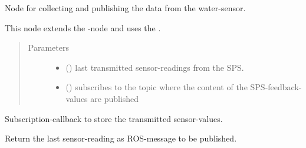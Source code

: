 \documentclass[a4paper,12pt,twoside]{article}
\begin{document}
\begin{fulllineitems}
\label{\detokenize{meso_control_pkg:meso_control_pkg.water_sensor_node.WaterSensor}}
Node for collecting and publishing the data from the water-sensor.

This node extends the -node and uses the .
\begin{quote}\begin{description}
\item[{Parameters}] \leavevmode\begin{itemize}
\item {} 
 (\sphinxstyleliteralemphasis{\sphinxupquote{{[}}}\sphinxstyleliteralemphasis{\sphinxupquote{{]}}}) \textendash{} last transmitted sensor-readings from the SPS.

\item {} 
 () \textendash{} subscribes to the topic where the content of the SPS-feedback-values
are published

\end{itemize}

\end{description}\end{quote}

\begin{fulllineitems}
\label{\detokenize{meso_control_pkg:meso_control_pkg.water_sensor_node.WaterSensor.modbus_handle}}
Subscription-callback to store the transmitted sensor-values.

\end{fulllineitems}


\begin{fulllineitems}
\label{\detokenize{meso_control_pkg:meso_control_pkg.water_sensor_node.WaterSensor.read_sensor}}
Return the last sensor-reading as ROS-message to be published.

\end{fulllineitems}


\end{fulllineitems}
\end{document}
